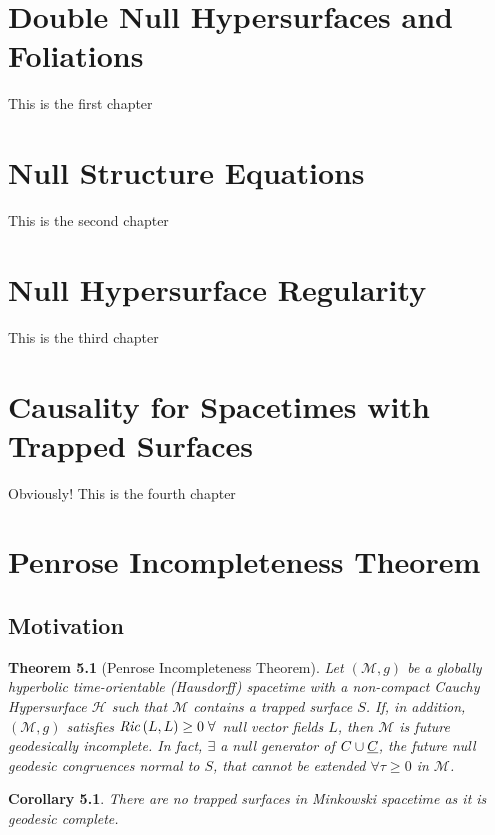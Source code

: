 \documentclass[11pt, a4paper]{report}
\theoremstyle{bfnote}
\newtheorem{theorem}{Theorem}[chapter]
\newtheorem{corollary}{Corollary}[theorem]
\begin{document}
\begin{samepage}

\chapter{Double Null Hypersurfaces and Foliations}
This is the first chapter

\chapter{Null Structure Equations}
This is the second chapter

\chapter{Null Hypersurface Regularity}
This is the third chapter

\chapter{Causality for Spacetimes with Trapped Surfaces}
Obviously! This is the fourth chapter

\chapter{Penrose Incompleteness Theorem}
\section{Motivation}
\begin{theorem}[Penrose Incompleteness Theorem]
Let $\left(\mathcal{M}, g\right)$ be a globally hyperbolic
time-orientable (Hausdorff) spacetime with a non-compact Cauchy Hypersurface
$\mathcal{H}$ such that $\mathcal{M}$ contains a trapped surface $S$. If, in
addition, $\left(\mathcal{M}, g\right)$ satisfies $\text{\textit{Ric}}\left(L,
L\right) \geq 0 \;\forall$ null vector fields $L$, then $\mathcal{M}$ is future
geodesically incomplete. In fact, $\exists$ a null generator of $C \cup
\underbar{$C$}$, the future null geodesic congruences normal to $S$, that cannot
be extended $\forall \tau \geq 0$ in $\mathcal{M}$.
\end{theorem}

\begin{corollary}{\label{MinkGeodcomplete}} 
    There are no trapped surfaces in Minkowski spacetime as it is geodesic complete.
\end{corollary}


\end{samepage}
\end{document}
